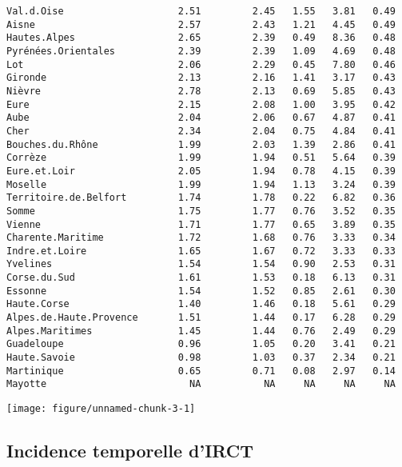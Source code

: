 \documentclass[11pt,a4paper]{article}\usepackage[]{graphicx}\usepackage[]{color}
\makeatletter
\def\maxwidth{ %
  \ifdim\Gin@nat@width>\linewidth
    \linewidth
  \else
    \Gin@nat@width
  \fi
}
\newenvironment{kframe}{%
 \def\at@end@of@kframe{}%
 \ifinner\ifhmode%
  \def\at@end@of@kframe{\end{minipage}}%
  \begin{minipage}{\columnwidth}%
 \fi\fi%
 \def\FrameCommand##1{\hskip\@totalleftmargin \hskip-\fboxsep
 \colorbox{shadecolor}{##1}\hskip-\fboxsep
     \hskip-\linewidth \hskip-\@totalleftmargin \hskip\columnwidth}%
 \MakeFramed {\advance\hsize-\width
   \@totalleftmargin\z@ \linewidth\hsize
   \@setminipage}}%
 {\par\unskip\endMakeFramed%
 \at@end@of@kframe}
\newenvironment{knitrout}{}{} %
\makeatother
\begin{document}
\begin{knitrout}
\begin{kframe}
\begin{verbatim}
Val.d.Oise                    2.51         2.45   1.55   3.81   0.49
Aisne                         2.57         2.43   1.21   4.45   0.49
Hautes.Alpes                  2.65         2.39   0.49   8.36   0.48
Pyrénées.Orientales           2.39         2.39   1.09   4.69   0.48
Lot                           2.06         2.29   0.45   7.80   0.46
Gironde                       2.13         2.16   1.41   3.17   0.43
Nièvre                        2.78         2.13   0.69   5.85   0.43
Eure                          2.15         2.08   1.00   3.95   0.42
Aube                          2.04         2.06   0.67   4.87   0.41
Cher                          2.34         2.04   0.75   4.84   0.41
Bouches.du.Rhône              1.99         2.03   1.39   2.86   0.41
Corrèze                       1.99         1.94   0.51   5.64   0.39
Eure.et.Loir                  2.05         1.94   0.78   4.15   0.39
Moselle                       1.99         1.94   1.13   3.24   0.39
Territoire.de.Belfort         1.74         1.78   0.22   6.82   0.36
Somme                         1.75         1.77   0.76   3.52   0.35
Vienne                        1.71         1.77   0.65   3.89   0.35
Charente.Maritime             1.72         1.68   0.76   3.33   0.34
Indre.et.Loire                1.65         1.67   0.72   3.33   0.33
Yvelines                      1.54         1.54   0.90   2.53   0.31
Corse.du.Sud                  1.61         1.53   0.18   6.13   0.31
Essonne                       1.54         1.52   0.85   2.61   0.30
Haute.Corse                   1.40         1.46   0.18   5.61   0.29
Alpes.de.Haute.Provence       1.51         1.44   0.17   6.28   0.29
Alpes.Maritimes               1.45         1.44   0.76   2.49   0.29
Guadeloupe                    0.96         1.05   0.20   3.41   0.21
Haute.Savoie                  0.98         1.03   0.37   2.34   0.21
Martinique                    0.65         0.71   0.08   2.97   0.14
Mayotte                         NA           NA     NA     NA     NA
\end{verbatim}
\end{kframe}
\end{knitrout}


\begin{knitrout}
\color{fgcolor}
\texttt{[image: figure/unnamed-chunk-3-1]} 

\end{knitrout}

  \subsection{Incidence temporelle d'IRCT}
\end{document}
